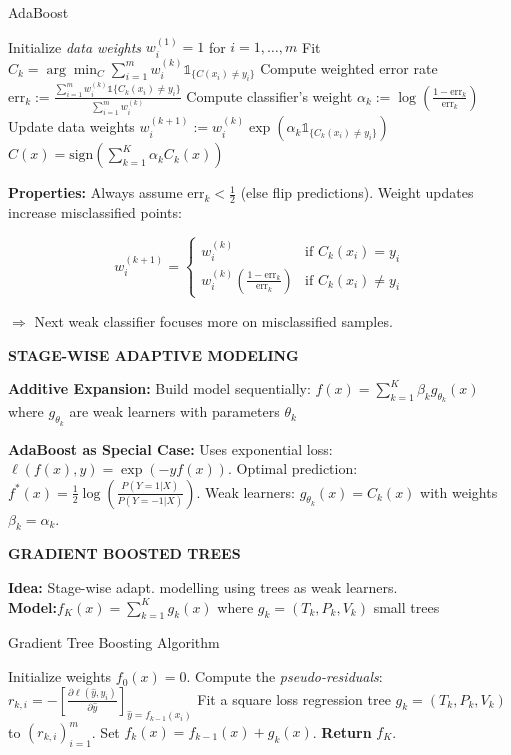 \documentclass[a4paper,10pt]{article}
\newcommand{\subtitle}[1]{\vspace{0.25cm}\begin{normalsize}\textbf{\textcolor{gray!150}{\uppercase{#1}}}\end{normalsize}}
\begin{document}
\begin{small}
\begin{algorithm}[H]
\footnotesize
\caption{AdaBoost}
\begin{algorithmic}[1]
\State Initialize \textit{data weights} $w_i^{(1)} = 1$ for $i=1,\ldots,m$
    \State Fit $C_k = \arg\min_C \sum_{i=1}^m w_i^{(k)}\mathds{1}_{\{C(x_i) \neq y_i\}}$
    \State Compute weighted error rate $\text{err}_k := \frac{\sum_{i=1}^m w_i^{(k)}\mathbb{1}\{C_k(x_i) \neq y_i\}}{\sum_{i=1}^m w_i^{(k)}}$
    \State Compute classifier's weight $\alpha_k := \log(\frac{1-\text{err}_k}{\text{err}_k})$
    \State Update data weights $w_i^{(k+1)} := w_i^{(k)}\exp(\alpha_k\mathds{1}_{\{C_k(x_i) \neq y_i\}})$
\EndFor
\State \Return $C(x) = \text{sign}(\sum_{k=1}^K \alpha_k C_k(x))$
\end{algorithmic}
\end{algorithm}

\textbf{Properties:} Always assume $\text{err}_k < \frac{1}{2}$ (else flip predictions). Weight updates increase misclassified points:
\begin{scriptsize}
$$w_i^{(k+1)} = \begin{cases}
w_i^{(k)} & \text{if } C_k(x_i) = y_i\\
w_i^{(k)}(\frac{1-\text{err}_k}{\text{err}_k}) & \text{if } C_k(x_i) \neq y_i
\end{cases}$$
\end{scriptsize}
$\Rightarrow$ Next weak classifier focuses more on misclassified samples.

\subtitle{Stage-wise Adaptive Modeling}
\textbf{Additive Expansion:} Build model sequentially: $f(x) = \sum_{k=1}^K \beta_k g_{\theta_k}(x)$
where $g_{\theta_k}$ are weak learners with parameters $\theta_k$

\textbf{AdaBoost as Special Case:}
Uses exponential loss: $\ell(f(x),y) = \exp(-yf(x))$. Optimal prediction: $f^*(x) = \frac{1}{2}\log(\frac{P(Y=1|X)}{P(Y=-1|X)})$. Weak learners: $g_{\theta_k}(x) = C_k(x)$ with weights $\beta_k = \alpha_k$.

\subtitle{Gradient Boosted Trees}

\textbf{Idea:} Stage-wise adapt. modelling using trees as weak learners. \\
\textbf{Model:}$f_K(x) = \sum_{k=1}^K g_k(x)$ where $g_k=(T_k, P_k, V_k)$ small trees

\begin{footnotesize}
\begin{algorithm}[H]
\footnotesize
\caption{Gradient Tree Boosting Algorithm}
\begin{algorithmic}[1]
\State Initialize weights $f_0(x) = 0$.
    \State Compute the \textit{pseudo-residuals}: 
    \(
    r_{k,i} = - \left[ \frac{\partial \ell(\hat{y}, y_i)}{\partial \hat{y}} \right]_{\hat{y} = f_{k-1}(x_i)}
    \) 
    \State Fit a square loss regression tree $g_k = (T_k, P_k, V_k)$ to $(r_{k,i})_{i=1}^m$.
    \State Set $f_k(x) = f_{k-1}(x) + g_k(x)$.
\EndFor
\State \textbf{Return} $f_K$.
\end{algorithmic}
\end{algorithm}
\end{footnotesize}



\end{small}
\end{document}
